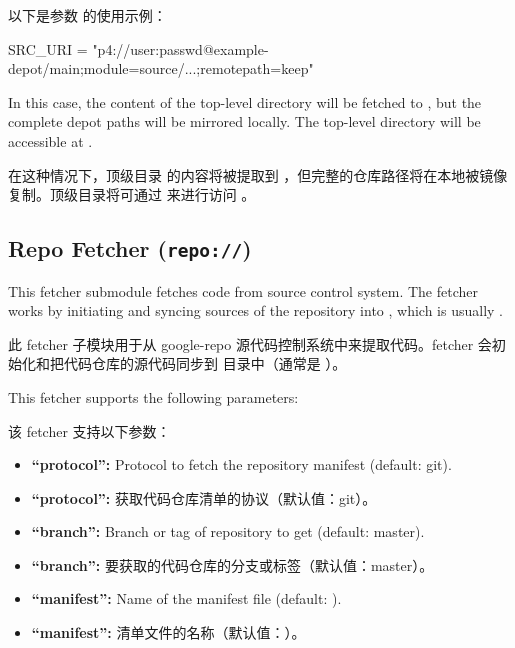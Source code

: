 以下是参数  的使用示例：

\begin{pyglist}
SRC_URI = "p4://user:passwd@example-depot/main;module=source/...;remotepath=keep"
\end{pyglist}

In this case, the content of the top-level directory  will be fetched to , but the complete depot paths will be mirrored locally. The top-level directory will be accessible at .

在这种情况下，顶级目录  的内容将被提取到 ，但完整的仓库路径将在本地被镜像复制。顶级目录将可通过  来进行访问 。

\subsection{Repo Fetcher (\texttt{repo://})}

This fetcher submodule fetches code from  source control system. The fetcher works by initiating and syncing sources of the repository into , which is usually .

此 fetcher 子模块用于从 google-repo 源代码控制系统中来提取代码。fetcher 会初始化和把代码仓库的源代码同步到  目录中（通常是  ）。

This fetcher supports the following parameters:

该 fetcher 支持以下参数：

\begin{itemize}
\setlength\itemsep{1.0em}
\item \textbf{``protocol'':} Protocol to fetch the repository manifest (default: git).
\item \textbf{``protocol'':} 获取代码仓库清单的协议（默认值：git）。

\item \textbf{``branch'':} Branch or tag of repository to get (default: master).
\item \textbf{``branch'':} 要获取的代码仓库的分支或标签（默认值：master）。

\item \textbf{``manifest'':} Name of the manifest file (default: ).
\item \textbf{``manifest'':} 清单文件的名称（默认值：）。
\end{itemize}

